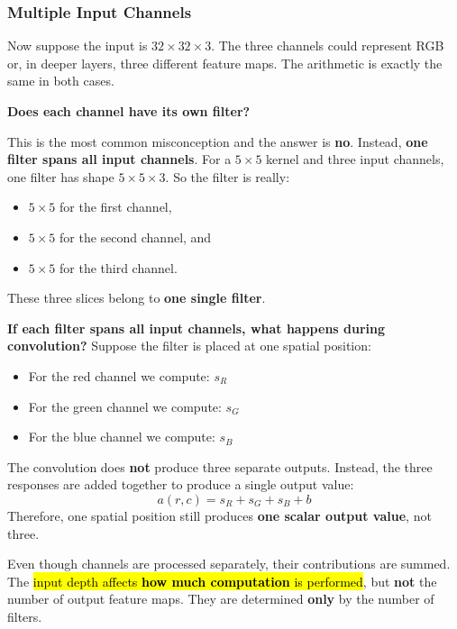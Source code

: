 \subsubsection{Multiple Input Channels}\label{sec:multiple-input-channels}

Now suppose the input is $32 \times 32 \times 3$. The three channels could represent RGB or, in deeper layers, three different feature maps. The arithmetic is exactly the same in both cases.

\highspace
\begin{flushleft}
    \textcolor{Green3}{ \textbf{Does each channel have its own filter?}}
\end{flushleft}
This is the most common misconception and the answer is \textbf{no}. Instead, \textbf{one filter spans all input channels}. For a $5 \times 5$ kernel and three input channels, one filter has shape $5 \times 5 \times 3$. So the filter is really:
\begin{itemize}
    \item $5 \times 5$ for the first channel,
    \item $5 \times 5$ for the second channel, and
    \item $5 \times 5$ for the third channel.
\end{itemize}
These three slices belong to \textbf{one single filter}.

\highspace
\textcolor{Green3}{ \textbf{If each filter spans all input channels, what happens during convolution?}}
Suppose the filter is placed at one spatial position:
\begin{itemize}
    \item For the red channel we compute: $s_R$
    \item For the green channel we compute: $s_G$
    \item For the blue channel we compute: $s_B$
\end{itemize}
The convolution does \textbf{not} produce three separate outputs. Instead, the three responses are added together to produce a single output value:
\begin{equation*}
    a(r, c) = s_R + s_G + s_B + b
\end{equation*}
Therefore, one spatial position still produces \textbf{one scalar output value}, not three.

\highspace
Even though channels are processed separately, their contributions are summed. The \hl{input depth affects \textbf{how much computation} is performed}, but \textbf{not} the number of output feature maps. They are determined \textbf{only} by the number of filters.

